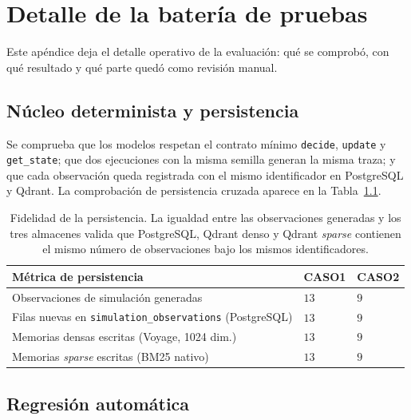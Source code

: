 \chapter{Detalle de la batería de pruebas}
\label{ap:capa1}

Este apéndice deja el detalle operativo de la evaluación: qué se comprobó, con
qué resultado y qué parte quedó como revisión manual.

\section{Núcleo determinista y persistencia}

Se comprueba que los modelos respetan el contrato mínimo
\texttt{decide}, \texttt{update} y \texttt{get\_state}; que dos ejecuciones con
la misma semilla generan la misma traza; y que cada observación queda registrada
con el mismo identificador en PostgreSQL y Qdrant. La comprobación de
persistencia cruzada aparece en la Tabla~\ref{tab:joinable}.

\begin{table}[H]
\begin{center}
\small
\renewcommand{\arraystretch}{1.16}
\begin{tabular}{|>{\raggedright\arraybackslash}p{6.2cm}|>{\centering\arraybackslash}p{2.5cm}|>{\centering\arraybackslash}p{2.5cm}|} \hline
\textbf{Métrica de persistencia} & \textbf{CASO1} & \textbf{CASO2} \\ \hline
Observaciones de simulación generadas & $13$ & $9$ \\ \hline
Filas nuevas en \texttt{simulation\_observations} (PostgreSQL) & $13$ & $9$ \\ \hline
Memorias densas escritas (Voyage, 1024 dim.) & $13$ & $9$ \\ \hline
Memorias \textit{sparse} escritas (BM25 nativo) & $13$ & $9$ \\ \hline
\end{tabular}
\caption[Fidelidad de la persistencia]{Fidelidad de la persistencia. La igualdad
entre las observaciones generadas y los tres almacenes valida que PostgreSQL,
Qdrant denso y Qdrant \textit{sparse} contienen el mismo número de observaciones
bajo los mismos identificadores.}
\label{tab:joinable}
\end{center}
\end{table}

\section{Regresión automática}

